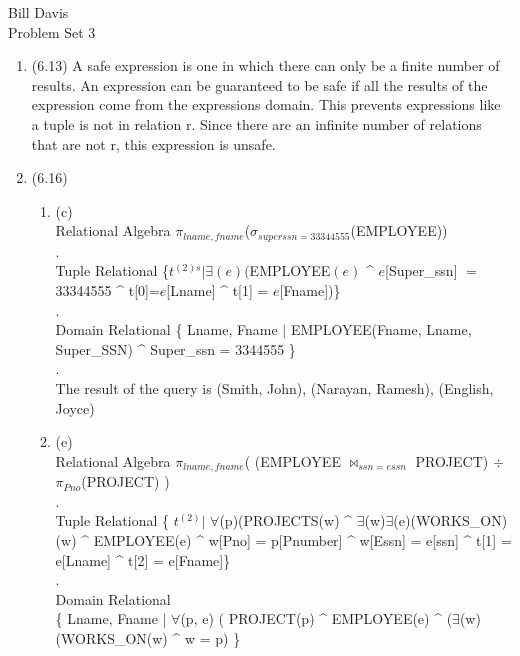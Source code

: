 \documentclass[11pt,fleqn]{article}
\begin{document}
\noindent Bill Davis \\
 Problem Set 3

\begin{enumerate}
\item (6.13) %
A safe expression is one in which there can only be a finite number of results. An expression can be guaranteed to be safe if all the results of the expression come from the expressions domain. This prevents expressions like a tuple is not in relation r. Since there are an infinite number of relations that are not r, this expression is unsafe.  

\item (6.16) %
  \begin{enumerate}
  \item (c) \\
Relational Algebra $\pi_{lname, fname}$($\sigma_{superssn=33344555}$(EMPLOYEE)) \\
.\\
Tuple Relational \{$t^{(2)s} | \exists(e) ($EMPLOYEE$(e)$ \^{} $e$[Super\_ssn] $=$ 33344555 \^{} t[0]=$e$[Lname] \^{} t[1] = $e$[Fname])\} \\
.\\
Domain Relational \{ Lname, Fname $|$ EMPLOYEE(Fname, Lname, Super\_SSN) \^{} Super\_ssn = 3344555 \} \\
.\\
The result of the query is (Smith, John), (Narayan, Ramesh), (English, Joyce)
  \item (e) \\
Relational Algebra
$\pi_{lname, fname}$( (EMPLOYEE $\Join_{ssn = essn}$ PROJECT)  $\div$ $\pi_{Pno}$(PROJECT) ) \\
.\\
Tuple Relational 
\{ $t^{(2)} | $  $\forall$(p)(PROJECTS(w) \^{} $\exists$(w)$\exists$(e)(WORKS\_ON)(w) \^{} EMPLOYEE(e) \^{} w[Pno] = p[Pnumber] \^{} w[Essn] = e[ssn] \^{} t[1] = e[Lname] \^{} t[2] = e[Fname]\} \\
.\\
Domain Relational \\
\{ Lname, Fname | $\forall$(p, e) ( PROJECT(p) \^{} EMPLOYEE(e) \^{} ($\exists$(w)(WORKS\_ON(w) \^{} w = p)  \}


\end{enumerate}
\end{enumerate}
\end{document}
